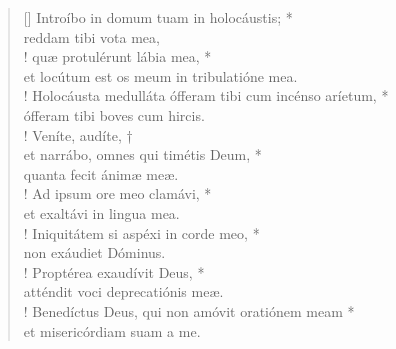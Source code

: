 \begin{verse}[\versewidth]
Introíbo in domum tuam in holocáustis; *\\
reddam tibi vota mea,\\!
\vin quæ protulérunt lábia mea, *\\
\vin et locútum est os meum in tribulatióne mea.\\!
Holocáusta medulláta ófferam tibi cum incénso aríetum, *\\
ófferam tibi boves cum hircis.\\!
\vin Veníte, audíte, †\\
\vin et narrábo, omnes qui timétis Deum, *\\
\vin quanta fecit ánimæ meæ.\\!
Ad ipsum ore meo clamávi, *\\
et exaltávi in lingua mea.\\!
\vin Iniquitátem si aspéxi in corde meo, *\\
\vin non exáudiet Dóminus.\\!
Proptérea exaudívit Deus, *\\
atténdit voci deprecatiónis meæ.\\!
\vin Benedíctus Deus, qui non amóvit oratiónem meam *\\
\vin et misericórdiam suam a me.\\
\end{verse}
\vspace{1cm}



